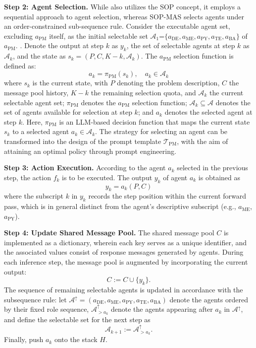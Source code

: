 \documentclass[preprint,12pt]{elsarticle}
\begin{document}
\medskip
\noindent\textbf{Step 2: Agent Selection.} While \citet{hongMetaGPTMetaProgramming2023a} also utilizes the SOP concept, it employs a sequential approach to agent selection, whereas SOP-MAS selects agents under an order-constrained sub-sequence rule. Consider the executable agent set, excluding $a_{\text{PM}}$ itself, as the initial selectable set $\mathcal{A}_1$=$\{a_{\text{DE}}, a_{\text{ME}}, a_{\text{PY}}, a_{\text{TE}}, a_{\text{BA}}\}$ of $a_{\text{PM}}$. . Denote the output at step $k$ as $y_k$, the set of selectable agents at step $k$ as $\mathcal{A}_k$, and the state as $s_k=(P, C, K-k, \mathcal{A}_k)$. The $a_{\text{PM}}$ selection function is defined as:
\begin{equation}
a_k=\pi_{\mathrm{PM}}\left(s_k\right), \quad a_k\in\mathcal{A}_k
\end{equation}
where $s_k$ is the current state, with $P$ denoting the problem description, $C$ the message pool history, $K-k$ the remaining selection quota, and $\mathcal{A}_k$ the current selectable agent set; $\pi_{\mathrm{PM}}$ denotes the $a_{\text{PM}}$ selection function; $\mathcal{A}_k \subseteq \mathcal{A}$ denotes the set of agents available for selection at step $k$; and $a_k$ denotes the selected agent at step $k$. Here, $\pi_{\mathrm{PM}}$ is an LLM-based decision function that maps the current state $s_k$ to a selected agent $a_k \in \mathcal{A}_k$. The strategy for selecting an agent can be transformed into the design of the prompt template $\mathcal{T}_\text{PM}$, with the aim of attaining an optimal policy through prompt engineering.

\medskip
\noindent\textbf{Step 3: Action Execution.}
According to the agent $a_k$ selected in the previous step, the action $f_k$ is to be executed. The output $y_k$ of agent $a_k$ is obtained as
\begin{equation}
y_k=a_k\left(P,C\right)
\end{equation}
where the subscript $k$ in $y_k$ records the step position within the current forward pass, which is in general distinct from the agent's descriptive subscript (e.g., $a_{\text{ME}}$, $a_{\text{PY}}$).

\medskip
\noindent\textbf{Step 4: Update Shared Message Pool.}
The shared message pool $C$ is implemented as a dictionary, wherein each key serves as a unique identifier, and the associated values consist of response messages generated by agents. During each inference step, the message pool is augmented by incorporating the current output:
\begin{equation}
C:= C\cup\{y_k\}.
\end{equation}
The sequence of remaining selectable agents is updated in accordance with the subsequence rule: let $\mathcal{A}^{\uparrow}=(a_{\text{DE}}, a_{\text{ME}}, a_{\text{PY}}, a_{\text{TE}}, a_{\text{BA}})$ denote the agents ordered by their fixed role sequence, $\mathcal{A}^{\uparrow}_{>a_k}$ denote the agents appearing after $a_k$ in $\mathcal{A}^{\uparrow}$, and define the selectable set for the next step as
\begin{equation}
\mathcal{A}_{k+1}:=\mathcal{A}^{\uparrow}_{>a_k}.
\end{equation}
 Finally, push $a_k$ onto the stack $H$.
\end{document}
